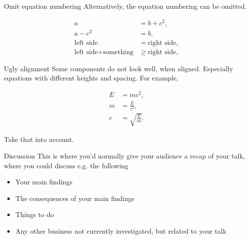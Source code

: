 \documentclass[aspectratio=169]{beamer}
\begin{document}
\begin{frame}{Omit equation numbering}
Alternatively, the equation numbering can be omitted.

	\begin{align*}
		a &= b + c^2, \\
		a - c^2 &= b, \\
		\text{left side} &= \text{right side}, \\
		\text{left side} + \text{something} &\geq \text{right side},
	\end{align*}
	
\end{frame}

\begin{frame}{Ugly alignment}
Some components do not look well, when aligned. Especially equations with different heights and spacing. For example,

\begin{align}
	E &= mc^2, \\
	m &= \frac{E}{c^2}, \\
	c & = \sqrt{\frac{E}{m}}.
\end{align}

Take that into account.

\end{frame}

\begin{frame}{Discussion}
This is where you'd normally give your audience a recap of your talk, where you could discuss e.g. the following
	\begin{itemize}
		\item Your main findings
		\item The consequences of your main findings
		\item Things to do
		\item Any other business not currently investigated, but related to your talk
	\end{itemize}
\end{frame}
\end{document}
